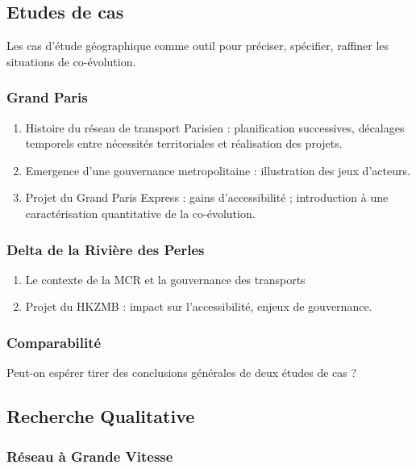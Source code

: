 \subsection{Etudes de cas}

Les cas d'étude géographique comme outil pour préciser, spécifier, raffiner les situations de co-évolution.


\subsubsection{Grand Paris}

\begin{enumerate}
	\item Histoire du réseau de transport Parisien : planification successives, décalages temporels entre nécessités territoriales et réalisation des projets.
	\item Emergence d'une gouvernance metropolitaine : illustration des jeux d'acteurs.
	\item Projet du Grand Paris Express : gains d'accessibilité ; introduction à une caractérisation quantitative de la co-évolution.
\end{enumerate}


\subsubsection{Delta de la Rivière des Perles}


\begin{enumerate}
	\item Le contexte de la MCR et la gouvernance des transports
	\item Projet du HKZMB : impact sur l'accessibilité, enjeux de gouvernance.
\end{enumerate}

\subsubsection{Comparabilité}

Peut-on espérer tirer des conclusions générales de deux études de cas ?




\subsection{Recherche Qualitative}

\subsubsection{Réseau à Grande Vitesse}

